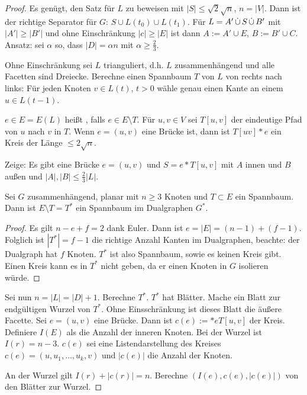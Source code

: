 \begin{proof}
    Es genügt, den Satz für $L$ zu beweisen mit $|S| \le \sqrt 2\sqrt{n}$, $n = |V|$.
    Dann ist der richtige Separator für $G$: $S \cup L(t_0) \cup L(t_1)$.
    Für $L = A' \mathop{\dot \cup} S \mathop{\dot \cup} B'$ mit $|A'| \ge |B'|$ und ohne Einschränkung $|c| \ge |E|$ ist dann $A := A' \cup E$, $B := B' \cup C$.
    Ansatz: sei $\alpha$ so, dass $|D| = \alpha n$ mit $\alpha \ge \frac{2}{3}$.

    Ohne Einschränkung sei $L$ trianguliert, d.h. $L$ zusammenhängend und alle Facetten sind Dreiecke.
    Berechne einen Spannbaum $T$ von $L$ von rechts nach links:
    Für jeden Knoten $v \in L(t)$, $t > 0$ wähle genau einen Kante an einem $u \in L(t-1)$.

    $e \in E = E(L)$ heißt , falls $e \in E \setminus T$.
    Für $u, v \in V$ sei $T[u,v]$ der eindeutige Pfad von $u$ nach $v$ in $T$.
    Wenn $e = (u,v)$ eine Brücke ist, dann ist $T[uv] \ast e$ ein Kreis der Länge $\le 2\sqrt n$.

    Zeige: Es gibt eine Brücke $e = (u,v)$ und $S = e \ast T[u,v]$ mit $A$ innen und $B$ außen und $|A|, |B| \le \frac{2}{3} |L|$.

    \begin{lem}
        Sei $G$ zusammenhängend, planar mit $n \ge 3$ Knoten und $T \subset E$ ein Spannbaum.
        Dann ist $E \setminus T = T^*$ ein Spannbaum im Dualgraphen $G^*$.
        \begin{proof}
            Es gilt $n - e + f = 2$ dank Euler.
            Dann ist $e = |E| = (n-1) + (f-1)$.
            Folglich ist $|T^*| = f - 1$ die richtige Anzahl Kanten im Dualgraphen, beachte: der Dualgraph hat $f$ Knoten.
            $T^*$ ist also Spannbaum, sowie es keinen Kreis gibt.
            Einen Kreis kann es in $T^*$ nicht geben, da er einen Knoten in $G$ isolieren würde.
        \end{proof}
    \end{lem}

    Sei nun $n = |L| = |D| + 1$.
    Berechne $T^*$.
    $T^*$ hat Blätter.
    Mache ein Blatt zur endgültigen Wurzel von $T^*$.
    Ohne Einsschränkung ist dieses Blatt die äußere Facette.
    Sei $e = (u,v)$ eine Brücke.
    Dann ist $c(e) := \ast e T[u,v]$ der Kreis.
    Definiere $I(E)$ als die Anzahl der inneren Knoten.
    Bei der Wurzel ist $I(r) = n - 3$.
    $c(e)$ sei eine Listendarstellung des Kreises $c(e) = (u, u_1, \dotsc, u_k, v)$ und $|c(e)|$ die Anzahl der Knoten.

    An der Wurzel gilt $I(r) + |c(r)| = n$.
    Berechne $(I(e), c(e), |c(e)|)$ von den Blätter zur Wurzel.


\end{proof}
